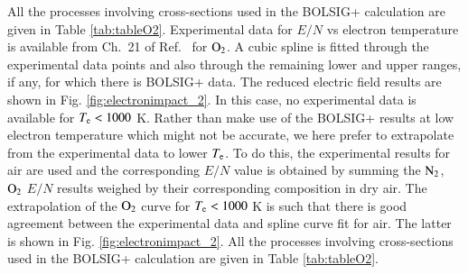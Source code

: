 All the processes involving cross-sections used in the BOLSIG+ calculation are given in Table \ref{tab:tableO2}. Experimental data for $E/N$ vs electron temperature is available from Ch.\ 21 of Ref.\  for $\rm O_2$. A cubic spline is fitted through the experimental data points and also through the remaining lower and upper ranges, if any, for which there is BOLSIG+ data.  The reduced electric field results are shown in Fig. \ref{fig:electronimpact_2}. In this case, no experimental data is available for $T_{\rm e}<1000$ K. Rather than make use of the BOLSIG+ results at low electron temperature which might not be accurate, we here prefer to extrapolate from the experimental data to lower $T_{\rm e}$. To do this, the experimental results for air are used and the corresponding $E/N$ value is obtained by summing the $\rm N_2$, $\rm O_2$ $E/N$ results weighed by their corresponding composition in dry air. The extrapolation of the $\rm O_2$ curve for $T_{\rm e}<1000$ K is such that there is good agreement between the experimental data and spline curve fit for air. The latter is shown in Fig. \ref{fig:electronimpact_2}. All the processes involving cross-sections used in the BOLSIG+ calculation are given in Table \ref{tab:tableO2}.
%



